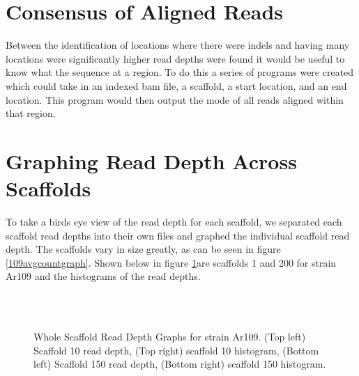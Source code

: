 \documentclass[12pt]{article}
\begin{document}
\section{Consensus of Aligned Reads}
\vspace{-0.5cm}
	Between the identification of locations where there were indels and having many locations were significantly higher read depths were found it would be useful to know what the sequence at a region. To do this a series of programs were created which could take in an indexed bam file, a scaffold, a start location, and an end location. This program would then output the mode of all reads aligned within that region. 

%
%
\vspace{-0.5cm}
\section{Graphing Read Depth Across Scaffolds}
\vspace{-0.5cm}
	To take a birds eye view of the read depth for each scaffold, we separated each scaffold read depths into their own files and graphed the individual scaffold read depth. The scaffolds vary in size greatly, as can be seen in figure \ref{109avgcountgraph}. Shown below in figure \ref{wholescaffandhisto}are scaffolds 1 and 200 for strain Ar109 and the histograms of the read depths.

\begin{figure}[H]
	\begin{centering}

		\\
		\\
		\begin{singlespace}
			\vspace{-0.5cm}
			\caption[Whole Scaffold Read Depth Graphs.]{Whole Scaffold Read Depth Graphs for strain Ar109. (Top left) Scaffold 10 read depth, (Top right) scaffold 10 histogram, (Bottom left) Scaffold 150 read depth, (Bottom right) scaffold 150 histogram.}\label{wholescaffandhisto}
		\end{singlespace}
	\end{centering}
\end{figure}
\end{document}
